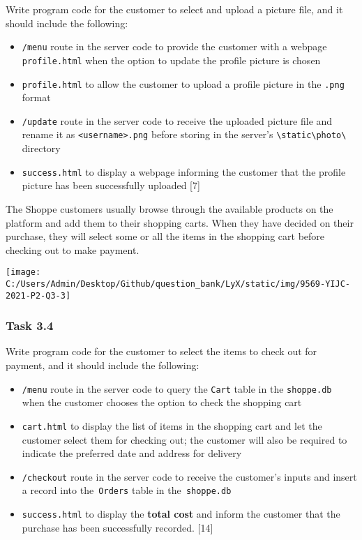 Write program code for the customer to select and upload a picture
file, and it should include the following: 
\begin{itemize}
\item \texttt{/menu} route in the server code to provide the customer with
a webpage \texttt{profile.html} when the option to update the profile
picture is chosen 
\item \texttt{profile.html} to allow the customer to upload a profile picture
in the \texttt{.png} format
\item \texttt{/update} route in the server code to receive the uploaded
picture file and rename it as \texttt{<username>.png} before storing
in the server\textquoteright s \texttt{\textbackslash static\textbackslash photo\textbackslash}
directory 
\item \texttt{success.html} to display a webpage informing the customer
that the profile picture has been successfully uploaded \hfill{}
{[}7{]}
\end{itemize}
The Shoppe customers usually browse through the available products
on the platform and add them to their shopping carts. When they have
decided on their purchase, they will select some or all the items
in the shopping cart before checking out to make payment. 
\noindent \begin{center}
\texttt{[image: C:/Users/Admin/Desktop/Github/question\_bank/LyX/static/img/9569-YIJC-2021-P2-Q3-3]}
\par\end{center}

\subsubsection*{Task 3.4 }

Write program code for the customer to select the items to check out
for payment, and it should include the following: 
\begin{itemize}
\item \texttt{/menu} route in the server code to query the \texttt{Cart}
table in the \texttt{shoppe.db} when the customer chooses the option
to check the shopping cart 
\item \texttt{cart.html} to display the list of items in the shopping cart
and let the customer select them for checking out; the customer will
also be required to indicate the preferred date and address for delivery 
\item \texttt{/checkout} route in the server code to receive the customer\textquoteright s
inputs and insert a record into the\texttt{ Orders} table in the\texttt{
shoppe.db }
\item \texttt{success.html} to display the \textbf{total cost} and inform
the customer that the purchase has been successfully recorded.\hfill{}
{[}14{]}
\end{itemize}